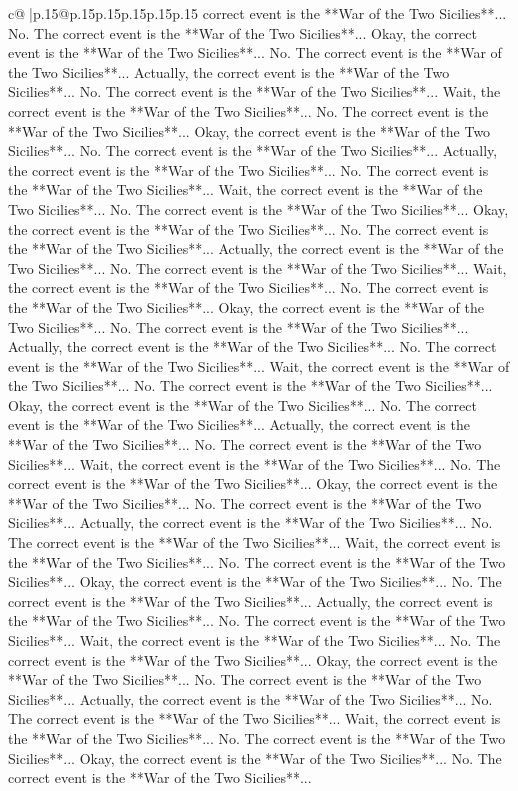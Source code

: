 \documentclass{article}
\begin{document}
{\begin{supertabular}{c@{$\;$}|p{.15\linewidth}@{}p{.15\linewidth}p{.15\linewidth}p{.15\linewidth}p{.15\linewidth}p{.15\linewidth}}
{{{correct event is the **War of the Two Sicilies**... No. The correct event is the **War of the Two Sicilies**... Okay, the correct event is the **War of the Two Sicilies**... No. The correct event is the **War of the Two Sicilies**... Actually, the correct event is the **War of the Two Sicilies**... No. The correct event is the **War of the Two Sicilies**... Wait, the correct event is the **War of the Two Sicilies**... No. The correct event is the **War of the Two Sicilies**... Okay, the correct event is the **War of the Two Sicilies**... No. The correct event is the **War of the Two Sicilies**... Actually, the correct event is the **War of the Two Sicilies**... No. The correct event is the **War of the Two Sicilies**... Wait, the correct event is the **War of the Two Sicilies**... No. The correct event is the **War of the Two Sicilies**... Okay, the correct event is the **War of the Two Sicilies**... No. The correct event is the **War of the Two Sicilies**... Actually, the correct event is the **War of the Two Sicilies**... No. The correct event is the **War of the Two Sicilies**... Wait, the correct event is the **War of the Two Sicilies**... No. The correct event is the **War of the Two Sicilies**... Okay, the correct event is the **War of the Two Sicilies**... No. The correct event is the **War of the Two Sicilies**... Actually, the correct event is the **War of the Two Sicilies**... No. The correct event is the **War of the Two Sicilies**... Wait, the correct event is the **War of the Two Sicilies**... No. The correct event is the **War of the Two Sicilies**... Okay, the correct event is the **War of the Two Sicilies**... No. The correct event is the **War of the Two Sicilies**... Actually, the correct event is the **War of the Two Sicilies**... No. The correct event is the **War of the Two Sicilies**... Wait, the correct event is the **War of the Two Sicilies**... No. The correct event is the **War of the Two Sicilies**... Okay, the correct event is the **War of the Two Sicilies**... No. The correct event is the **War of the Two Sicilies**... Actually, the correct event is the **War of the Two Sicilies**... No. The correct event is the **War of the Two Sicilies**... Wait, the correct event is the **War of the Two Sicilies**... No. The correct event is the **War of the Two Sicilies**... Okay, the correct event is the **War of the Two Sicilies**... No. The correct event is the **War of the Two Sicilies**... Actually, the correct event is the **War of the Two Sicilies**... No. The correct event is the **War of the Two Sicilies**... Wait, the correct event is the **War of the Two Sicilies**... No. The correct event is the **War of the Two Sicilies**... Okay, the correct event is the **War of the Two Sicilies**... No. The correct event is the **War of the Two Sicilies**... Actually, the correct event is the **War of the Two Sicilies**... No. The correct event is the **War of the Two Sicilies**... Wait, the correct event is the **War of the Two Sicilies**... No. The correct event is the **War of the Two Sicilies**... Okay, the correct event is the **War of the Two Sicilies**... No. The correct event is the **War of the Two Sicilies**... }}}
\end{supertabular}}
\end{document}
